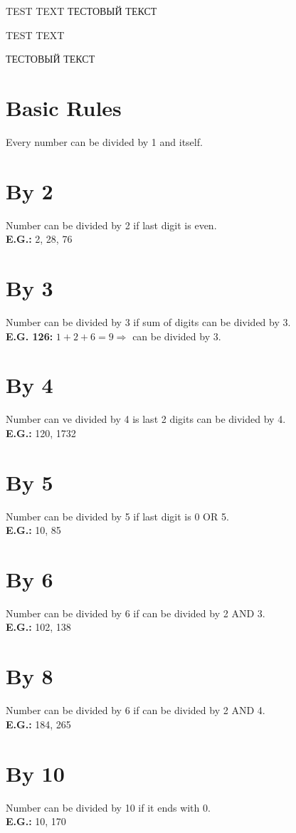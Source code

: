 \documentclass[a4paper]{article}
\begin{document}
TEST TEXT
ТЕСТОВЫЙ ТЕКСТ

\begin{Large}

TEST TEXT

ТЕСТОВЫЙ ТЕКСТ

\section*{Basic Rules}

Every number can be divided by 1 and itself.

\section*{By 2}

Number can be divided by 2 if last digit is even. \\[0.125cm]
\textbf{E.G.:} 2, 28, 76

\section*{By 3}

Number can be divided by 3 if sum of digits can be divided by 3. \\[0.125cm]
\textbf{E.G. 126:} $1 + 2 + 6 = 9 \Rightarrow$ can be divided by 3.

\section*{By 4}

Number can ve divided by 4 is last 2 digits can be divided by 4. \\[0.125cm]
\textbf{E.G.:} 120, 1732

\section*{By 5}

Number can be divided by 5 if last digit is 0 OR 5. \\[0.125cm]
\textbf{E.G.:} 10, 85

\section*{By 6}

Number can be divided by 6 if can be divided by 2 AND 3. \\[0.125cm]
\textbf{E.G.:} 102, 138

\section*{By 8}

Number can be divided by 6 if can be divided by 2 AND 4. \\[0.125cm]
\textbf{E.G.:} 184, 265

\section*{By 10}

Number can be divided by 10 if it ends with 0. \\[0.125cm]
\textbf{E.G.:} 10, 170

\end{Large}
\end{document}

